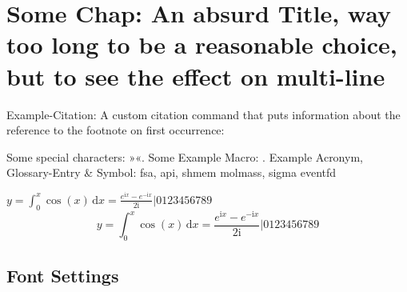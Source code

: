 
\chapter[Alternative \enquote{Some Chap} Title. Shorter for page-heading]{Some Chap: An absurd Title, way too long to be a reasonable choice, but to see the effect on multi-line}
\label{chap:chapter1}


Example-Citation:
\cite{DenKr_denkrement1_indeco}
\nl%
A custom citation command that puts information about the reference to the footnote on first occurrence:
%

\npi%
Some special characters:
»«.
\nl%
Some Example Macro:
.
\nl%
Example Acronym, Glossary-Entry \& Symbol:\nl
\gls{fsa}, \gls{api}, \gls{shmem}\nl
\gls{molmass}, \gls{sigma}\nl
\gls{eventfd}

\np
\newcommand{\I}{\mathrm{i}}
$y = \int_0^x\cos(x)\,\mathrm{d}{x} = \frac{e^{\I x} - e^{-\I x}}{2\I} | 0123456789$
\nl
\begin{equation}
y = \int_0^x\cos(x)\,\mathrm{d}{x} = \frac{e^{\I x} - e^{-\I x}}{2\I} | 0123456789
\end{equation}







\section{Font Settings}

